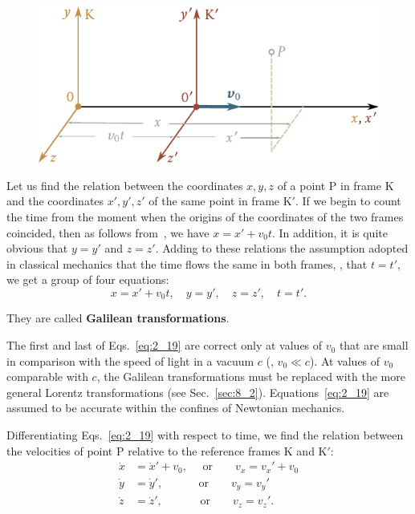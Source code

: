 \begin{figure}[t]
	\begin{center}
		\includegraphics[scale=1]{figures/ch_02/fig_2_3.pdf}
		\caption[]{}
		\label{fig:2_3}
	\end{center}
	\vspace{-0.7cm}
\end{figure}

Let us find the relation between the coordinates $x, y, z$ of a point P in frame K and the coordinates $x', y', z'$ of the same point in frame K$'$. If we begin to count the time from the moment when the origins of the coordinates of the two frames coincided, then as follows from~, we have $x=x'+v_0t$. In addition, it is quite obvious that $y=y'$ and $z=z'$. Adding to these relations the assumption adopted in classical mechanics that the time flows the same in both frames, \ie, that $t=t'$, we get a group of four equations:
\begin{equation}\label{eq:2_19}
x=x'+v_0t,\quad y=y',\quad z=z',\quad t=t'.
\end{equation}

\noindent
They are called \textbf{Galilean transformations}.

The first and last of Eqs.~\eqref{eq:2_19} are correct only at values of $v_0$ that are small in comparison with the speed of light in a vacuum $c$ (\ie, $v_0\ll c$). At values of $v_0$ comparable with $c$, the Galilean transformations must be replaced with the more general Lorentz transformations (see Sec.~\ref{sec:8_2}). Equations~\eqref{eq:2_19} are assumed to be accurate within the confines of Newtonian mechanics.

Differentiating Eqs.~\eqref{eq:2_19} with respect to time, we find the relation between the velocities of point P relative to the reference frames K and K$'$:
\begin{align}
\dot{x} &= \dot{x}'+v_0, \quad\,\,\text{or}\quad\quad v_x=v_x'+v_0\nonumber\\
\dot{y} &= \dot{y}', \quad\quad\,\,\,\,\,\,\,\text{or}\quad\quad v_y=v_y'\label{eq:2_20}\\
\dot{z} &= \dot{z}', \quad\quad\,\,\,\,\,\,\,\,\text{or}\quad\quad v_z=v_z'.\nonumber
\end{align}

